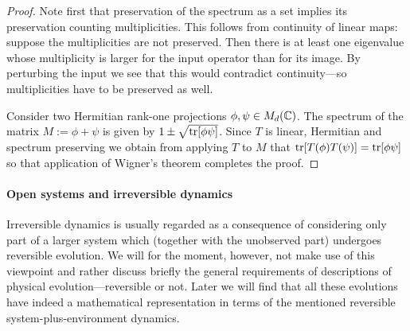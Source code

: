 \documentclass[11pt,a4paper]{article}
\theoremstyle{plain}
\theoremstyle{definition}
\theoremstyle{remark}
\numberwithin{equation}{section}
\begin{document}
\begin{proof}
    Note first that preservation of the spectrum as a set implies its preservation counting multiplicities. This follows from continuity of linear maps: suppose the multiplicities are not preserved. Then there is at least one eigenvalue whose multiplicity is larger for the input operator than for its image. By perturbing the input we see that this would contradict continuity---so multiplicities have to be preserved as well.

    Consider two Hermitian rank-one projections $\phi,\psi\in M_d(\mathbb{C})$. The spectrum of the matrix $M:=\phi+\psi$ is given by $1\pm \sqrt{\operatorname{tr}[\phi\psi]}$. Since $T$ is linear, Hermitian and spectrum preserving we obtain from applying $T$ to $M$ that $\operatorname{tr}[T(\phi)T(\psi)]=\operatorname{tr}[\phi\psi]$ so that application of Wigner's theorem completes the proof.
\end{proof}

\paragraph{Open systems and irreversible dynamics}
Irreversible dynamics is usually regarded as a consequence of considering only part of a larger system which (together with the unobserved part) undergoes reversible evolution. We will for the moment, however, not make use of this viewpoint and rather discuss briefly the general requirements of descriptions of physical evolution---reversible or not. Later we will find that all these evolutions have indeed a mathematical representation in terms of the mentioned reversible system-plus-environment dynamics.
\end{document}
